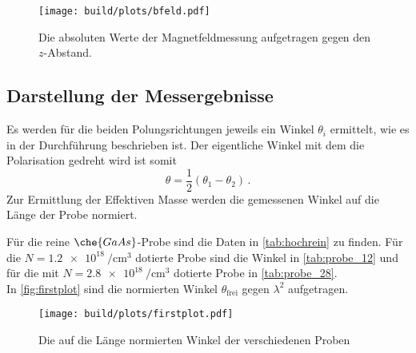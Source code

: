     \begin{figure}[H]
        \centering
        \texttt{[image: build/plots/bfeld.pdf]}
        \caption{Die absoluten Werte der Magnetfeldmessung aufgetragen gegen den $z$-Abstand.}
        \label{fig:bfeld}
    \end{figure}

\subsection{Darstellung der Messergebnisse}

    \noindent Es werden für die beiden Polungsrichtungen jeweils ein Winkel $\theta_i$ ermittelt, wie es in der Durchführung beschrieben ist. 
    Der eigentliche Winkel mit dem die Polarisation gedreht wird ist somit 
    \begin{equation*}
        \theta = \frac{1}{2}\left( \theta_1 - \theta_2\right)\, .
    \end{equation*}
    Zur Ermittlung der Effektiven Masse werden die gemessenen Winkel auf die Länge der Probe normiert. 

    \noindent Für die reine $\che{GaAs}$-Probe sind die Daten in \autoref{tab:hochrein} zu finden. Für die $N = \SI{1.2e18}{\per\centi\metre\tothe{3}}$ dotierte 
    Probe sind die Winkel in \autoref{tab:probe_12} und für die mit $N = \SI{2.8e18}{\per\centi\metre\tothe{3}}$ dotierte Probe in \autoref{tab:probe_28}. \\
    In \autoref{fig:firstplot} sind die normierten Winkel $\theta_\text{frei}$ gegen $\lambda^2$ aufgetragen. 

    \begin{figure}[H]
        \centering
        \texttt{[image: build/plots/firstplot.pdf]}
        \caption{Die auf die Länge normierten Winkel der verschiedenen Proben}
        \label{fig:firstplot}
    \end{figure}

